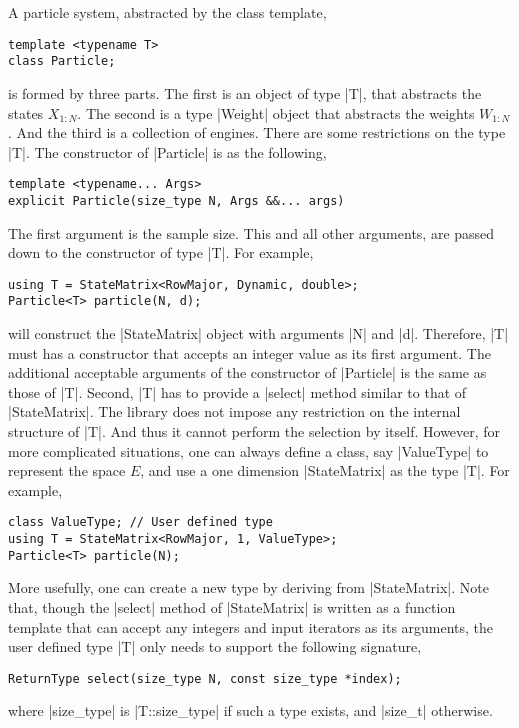 A particle system, abstracted by the class template,
\begin{verbatim}
template <typename T>
class Particle;
\end{verbatim}
is formed by three parts. The first is an object of type |T|, that abstracts
the states $X_{1:N}$. The second is a type |Weight| object that abstracts the
weights $W_{1:N}$. And the third is a collection of \rng engines. There are
some restrictions on the type |T|. The constructor of |Particle| is as the
following,
\begin{verbatim}
template <typename... Args>
explicit Particle(size_type N, Args &&... args)
\end{verbatim}
The first argument is the sample size. This and all other arguments, are passed
down to the constructor of type |T|. For example,
\begin{verbatim}
using T = StateMatrix<RowMajor, Dynamic, double>;
Particle<T> particle(N, d);
\end{verbatim}
will construct the |StateMatrix| object with arguments |N| and |d|. Therefore,
|T| must has a constructor that accepts an integer value as its first argument.
The additional acceptable arguments of the constructor of |Particle| is the
same as those of |T|. Second, |T| has to provide a |select| method similar to
that of |StateMatrix|. The library does not impose any restriction on the
internal structure of |T|. And thus it cannot perform the selection by itself.
However, for more complicated situations, one can always define a class, say
|ValueType| to represent the space $E$, and use a one dimension |StateMatrix|
as the type |T|. For example,
\begin{verbatim}
class ValueType; // User defined type
using T = StateMatrix<RowMajor, 1, ValueType>;
Particle<T> particle(N);
\end{verbatim}
More usefully, one can create a new type by deriving from |StateMatrix|. Note
that, though the |select| method of |StateMatrix| is written as a function
template that can accept any integers and input iterators as its arguments, the
user defined type |T| only needs to support the following signature,
\begin{verbatim}
ReturnType select(size_type N, const size_type *index);
\end{verbatim}
where |size_type| is |T::size_type| if such a type exists, and |size_t|
otherwise.

